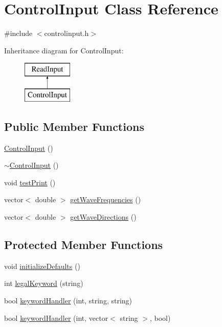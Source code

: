 \hypertarget{class_control_input}{\section{Control\-Input Class Reference}
\label{class_control_input}
}


{\ttfamily \#include $<$controlinput.\-h$>$}

Inheritance diagram for Control\-Input\-:\begin{figure}[H]
\begin{center}
\leavevmode
\includegraphics[height=2.000000cm]{class_control_input}
\end{center}
\end{figure}
\subsection*{Public Member Functions}
\begin{DoxyCompactItemize}
\item 
\hyperlink{class_control_input_a50dc4cde4f6410238119971b6934c63a}{Control\-Input} ()
\item 
\hyperlink{class_control_input_aa35022d7c6edbfef7150eb4db594ba58}{$\sim$\-Control\-Input} ()
\item 
void \hyperlink{class_control_input_a2f95d64805ed477f78bf778bb786b30b}{test\-Print} ()
\item 
vector$<$ double $>$ \hyperlink{class_control_input_a3febc929e09306f21f484249c89dbc80}{get\-Wave\-Frequencies} ()
\item 
vector$<$ double $>$ \hyperlink{class_control_input_a2e80de357be6fe5112add0f5066c6328}{get\-Wave\-Directions} ()
\end{DoxyCompactItemize}
\subsection*{Protected Member Functions}
\begin{DoxyCompactItemize}
\item 
void \hyperlink{class_control_input_af15fe8b88a0e7f496c7fd0d4795ff900}{initialize\-Defaults} ()
\item 
int \hyperlink{class_control_input_af7295a9ba455debb812f0e1d4a647820}{legal\-Keyword} (string)
\item 
bool \hyperlink{class_control_input_acb4fb4c1d2a2453e3b8986e44e096f63}{keyword\-Handler} (int, string, string)
\item 
bool \hyperlink{class_control_input_a33b353c2d8f4316d1543059a319faba7}{keyword\-Handler} (int, vector$<$ string $>$, bool)
\end{DoxyCompactItemize}


